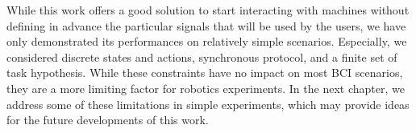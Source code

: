 While this work offers a good solution to start interacting with machines without defining in advance the particular signals that will be used by the users, we have only demonstrated its performances on relatively simple scenarios. Especially, we considered discrete states and actions, synchronous protocol, and a finite set of task hypothesis. While these constraints have no impact on most BCI scenarios, they are a more limiting factor for robotics experiments. In the next chapter, we address some of these limitations in simple experiments, which may provide ideas for the future developments of this work.



















